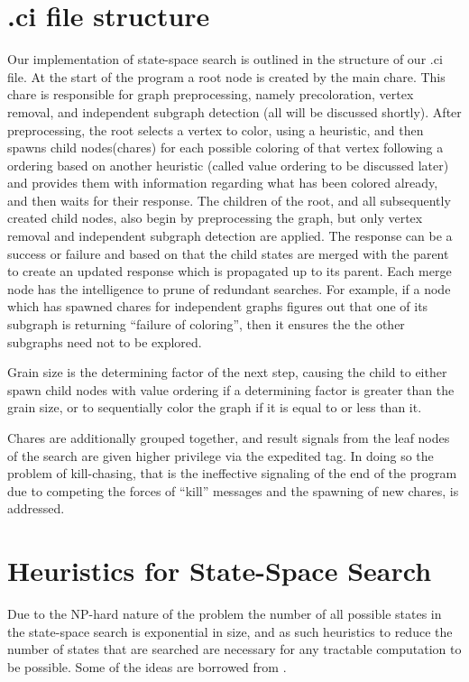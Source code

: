 \documentclass[10pt,twoside]{article}
\begin{document}
\section{.ci file structure}
Our implementation of state-space search is outlined in the structure of our
  .ci file. At the start of the program a root node is created by the main
  chare. This chare is responsible for graph preprocessing, namely
  precoloration, vertex removal, and independent subgraph detection (all will
      be discussed shortly). After preprocessing, the root selects a vertex to
  color, using a heuristic, and then spawns child nodes(chares) for each
  possible coloring of that vertex following a ordering based on another
  heuristic (called value ordering to be discussed later) and  provides them with information regarding what has been colored
  already, and then waits for their response.  The children of the root, and
  all subsequently created child nodes, also begin by preprocessing the graph,
      but only vertex removal and independent subgraph detection are applied.
        The response can be a success or failure and based on that the child
        states are merged with the parent to create an  updated response which
        is propagated up to its parent. Each merge node has the intelligence to
        prune of redundant searches. For example, if a node which has spawned
        chares for independent graphs figures out that one of its subgraph is
        returning ``failure of coloring'', then it ensures the the other
        subgraphs need not to be explored. 
  
  Grain size is the determining factor of the next step, causing the child to
  either spawn child nodes with value ordering if a determining factor is
  greater than the grain size, or to sequentially color the graph if it is
  equal to or less than it. 

      Chares are additionally grouped together, and result signals from the
      leaf nodes of the search are given higher privilege via the expedited
      tag. In doing so the problem of kill-chasing, that is the ineffective
      signaling of the end of the program due to competing the forces of “kill”
      messages and the spawning of new chares, is addressed.

\section{Heuristics for State-Space Search}
Due to the NP-hard nature of the problem the number of all possible states in
  the state-space search is exponential in size, and as such heuristics to
  reduce the number of states that are searched are necessary for any tractable
  computation to be possible. Some of the ideas are borrowed from
  \cite{Kale1995}.
\end{document}
